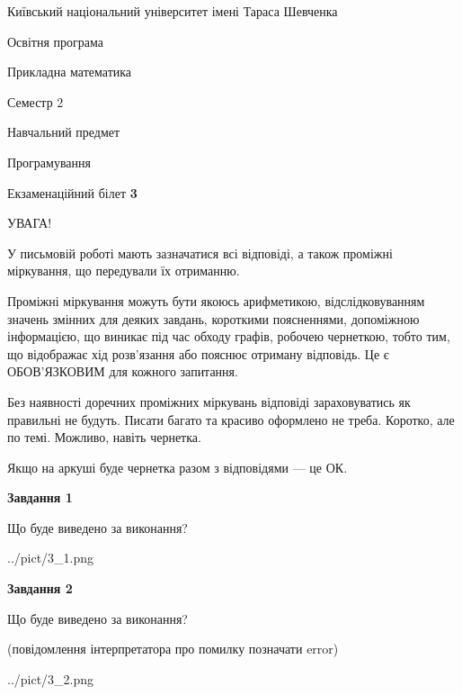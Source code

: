 \documentclass[12pt, ukrainian]{article}
\begin{document}
{{\begin {small}\par
{ \center  Київський національний університет імені Тараса Шевченка \par}
{\parbox {5 cm}{Освітня програма \hfill}{\parbox {7 cm}{Прикладна математика\hfill}}\parbox {6 cm}{\hfill Семестр 2}}\par
{\parbox {5 cm} {Навчальний предмет \hfill}\parbox {7 cm}{Програмування \hfill}\parbox {6cm}{\hfill}\par}\vspace{-7pt} \end{small}}{\center Екзаменаційний білет \No \textbf
{ 3 }\par}}
{
\begin {large}
УВАГА!

У письмовій роботі мають зазначатися всі відповіді, а також проміжні міркування, що передували їх отриманню.

Проміжні міркування можуть бути якоюсь арифметикою, відслідковуванням зна\-чень змінних для деяких завдань,
короткими поясненнями, допоміжною інформацією, що виникає під час обходу графів, робочею чернеткою,
тобто тим, що відображає хід розв’язання або пояснює отриману відповідь.
Це є ОБОВ’ЯЗКОВИМ для кожного запитання.

Без наявності доречних проміжних міркувань відповіді зараховуватись як правиль\-ні не будуть.
Писати багато та красиво оформлено не треба. Коротко, але по темі. Можли\-во, навіть чернетка.

Якщо на аркуші буде чернетка разом з відповідями --- це ОК.

\newpage

{\begin {center}\textbf{Завдання 1}\end {center}}\par
Що буде виведено за виконання?\par
\begin{center}
	{../pict/3_1.png}
\end{center}
\newpage

{\begin {center}\textbf{Завдання 2}\end {center}}\par
Що буде виведено за виконання?\par
 (повідомлення інтерпретатора про помилку позначати error)\par
\begin{center}
	{../pict/3_2.png}
\end{center}
\newpage


\end{large}}
\end{document}
